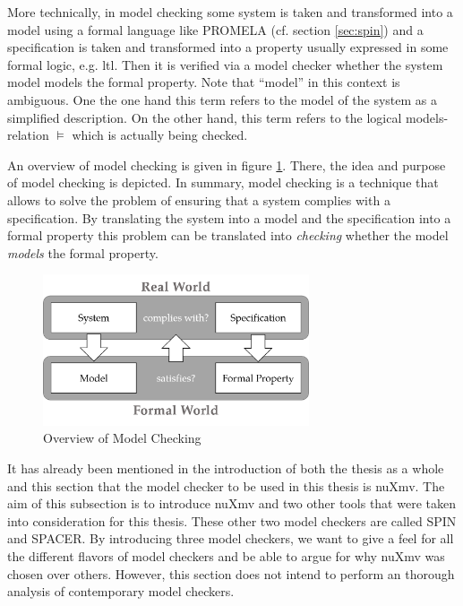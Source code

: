 More technically, in model checking some system is taken and transformed into a model using a formal language like PROMELA (cf. section \ref{sec:spin}) and a specification is taken and transformed into a property usually expressed in some formal logic, e.g. \gls{ltl}.
Then it is verified via a model checker whether the system model models the formal property.
Note that \enquote{model} in this context is ambiguous.
One the one hand this term refers to the model of the system as a simplified description.
On the other hand, this term refers to the logical models-relation $ \models $ which is actually being checked.

An overview of model checking is given in figure \ref{fig:model-checking}.
There, the idea and purpose of model checking is depicted.
In summary, model checking is a technique that allows to solve the problem of ensuring that a system complies with a specification.
By translating the system into a model and the specification into a formal property this problem can be translated into \textit{checking} whether the model \textit{models} the formal property.

\begin{figure}
    \centering
    \includegraphics[width=0.7\textwidth]{figures/model-checking.png}
    \caption{Overview of Model Checking}
    \label{fig:model-checking}
\end{figure}

It has already been mentioned in the introduction of both the thesis as a whole and this section that the model checker to be used in this thesis is nuXmv.
The aim of this subsection is to introduce nuXmv and two other tools that were taken into consideration for this thesis.
These other two model checkers are called SPIN and SPACER.
By introducing three model checkers, we want to give a feel for all the different flavors of model checkers and be able to argue for why nuXmv was chosen over others.
However, this section does not intend to perform an thorough analysis of contemporary model checkers.

